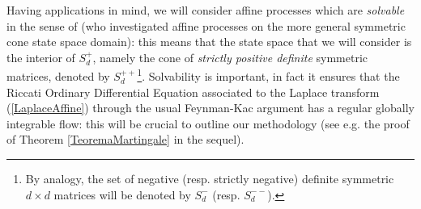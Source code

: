Having applications in mind, we will consider affine processes which are \textit{solvable} in the sense of \cite{article_Grasselli} (who investigated  affine processes on the more general symmetric cone state space domain): this means that the state space that we will consider is the interior of $S_{d}^{+}$, namely the cone of \textit{strictly positive definite} symmetric matrices, denoted by $S_{d}^{++}$\footnote{By analogy, the set of negative (resp. strictly negative) definite symmetric $d\times d$ matrices will be denoted by $S_{d}^{-}$ (resp. $S_{d}^{--}$).}.
 Solvability is important, in fact it ensures that the Riccati Ordinary Differential Equation associated to the Laplace transform (\ref{LaplaceAffine}) through the usual Feynman-Kac argument has a regular globally integrable flow: this will be crucial to outline our methodology (see e.g. the proof of Theorem \ref{TeoremaMartingale} in the sequel). \\
%
%
%  
